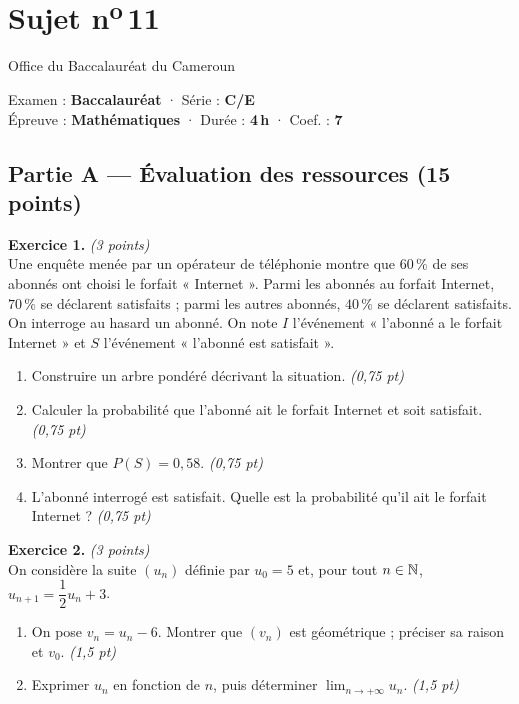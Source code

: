 \section{Sujet n\textsuperscript{o}\,11}
\noindent\begin{minipage}{0.5\linewidth}\footnotesize Office du Baccalauréat du Cameroun\end{minipage}%
\hfill\begin{minipage}{0.45\linewidth}\footnotesize\raggedleft Examen : \textbf{Baccalauréat} · Série : \textbf{C/E}\\
Épreuve : \textbf{Mathématiques} · Durée : \textbf{4\,h} · Coef. : \textbf{7}\end{minipage}
\par\smallskip{\color{onbo}\rule{\linewidth}{1pt}}

\subsection*{Partie A — Évaluation des ressources \hfill (15 points)}

\noindent\textbf{Exercice 1.} \hfill\textit{(3 points)}\\
Une enquête menée par un opérateur de téléphonie montre que $60\,\%$ de ses abonnés ont
choisi le forfait « Internet ». Parmi les abonnés au forfait Internet, $70\,\%$ se déclarent
satisfaits ; parmi les autres abonnés, $40\,\%$ se déclarent satisfaits. On interroge au
hasard un abonné. On note $I$ l'événement « l'abonné a le forfait Internet » et $S$
l'événement « l'abonné est satisfait ».
\begin{enumerate}[label=\arabic*)]
\item Construire un arbre pondéré décrivant la situation. \hfill\textit{(0,75 pt)}
\item Calculer la probabilité que l'abonné ait le forfait Internet et soit satisfait. \hfill\textit{(0,75 pt)}
\item Montrer que $P(S)=0{,}58$. \hfill\textit{(0,75 pt)}
\item L'abonné interrogé est satisfait. Quelle est la probabilité qu'il ait le forfait Internet ? \hfill\textit{(0,75 pt)}
\end{enumerate}

\smallskip
\noindent\textbf{Exercice 2.} \hfill\textit{(3 points)}\\
On considère la suite $(u_n)$ définie par $u_0=5$ et, pour tout $n\in\mathbb{N}$,
$u_{n+1}=\dfrac12 u_n+3$.
\begin{enumerate}[label=\arabic*)]
\item On pose $v_n=u_n-6$. Montrer que $(v_n)$ est géométrique ; préciser sa raison et $v_0$. \hfill\textit{(1,5 pt)}
\item Exprimer $u_n$ en fonction de $n$, puis déterminer $\displaystyle\lim_{n\to+\infty}u_n$. \hfill\textit{(1,5 pt)}
\end{enumerate}

